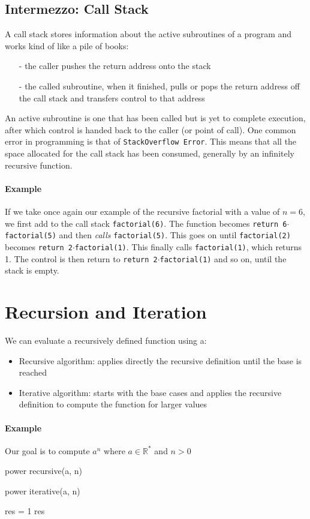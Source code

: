 \documentclass[10pt,a4paper]{book}
\newcommand{\R}{\mathbb{R}}
\begin{document}
\subsection{Intermezzo: Call Stack}
A call stack stores information about the active subroutines of a program and works kind of like a pile of books: 
\begin{itemize}
\item[-] the caller pushes the return address onto the stack
\item[-] the called subroutine, when it finished, pulls or pops the return address off the call stack and transfers control to that address
\end{itemize}
An active subroutine is one that has been called but is yet to complete execution, after which control is handed back to the caller (or point of call). One common error in programming is that of \texttt{StackOverflow Error}. This means that all the space allocated for the call stack has been consumed, generally by an infinitely recursive function.\par 
\paragraph*{Example}
If we take once again our example of the recursive factorial with a value of $n=6$, we first add to the call stack \texttt{factorial(6)}. The function becomes \texttt{return 6$\cdot$factorial(5)} and then \textit{calls} \texttt{factorial(5)}. This goes on until \texttt{factorial(2)} becomes \texttt{return 2$\cdot$factorial(1)}. This finally calls \texttt{factorial(1)}, which returns 1. The control is then return to \texttt{return 2$\cdot$factorial(1)} and so on, until the stack is empty.
\section{Recursion and Iteration}
We can evaluate a recursively defined function using a:
\begin{itemize}
\item Recursive algorithm: applies directly the recursive definition until the base is reached
\item Iterative algorithm: starts with the base cases and applies the recursive definition to compute the function for larger values
\end{itemize}
\paragraph*{Example}
Our goal is to compute $a^n$ where $a \in \R^{*}$ and $n>0$\par 
\begin{procedure}
\caption{power recursive(a, n)}
\DontPrintSemicolon
\SetAlgoNoEnd
{}
\end{procedure}
\begin{procedure}
\caption{power iterative(a, n)}
\DontPrintSemicolon
\SetAlgoNoEnd
res = 1\;
\KwRet res
\end{procedure}
\end{document}
